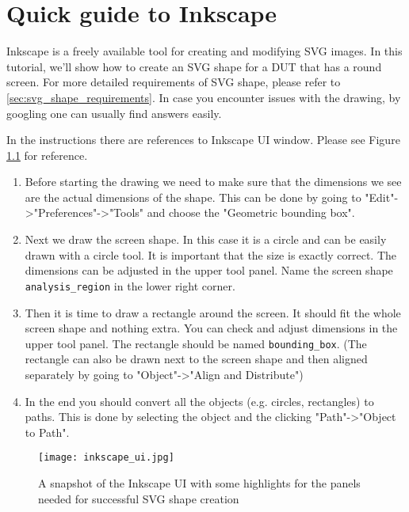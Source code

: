 \chapter{Quick guide to Inkscape}
\label{app:inkscape_guide}
Inkscape is a freely available tool for creating and modifying SVG images. In this tutorial, we'll show how to create an SVG shape for a DUT that has a round screen. For more detailed requirements of SVG shape, please refer to \ref{sec:svg_shape_requirements}. In case you encounter issues with the drawing, by googling one can usually find answers easily.

In the instructions there are references to Inkscape UI window. Please see Figure \ref{fig:inkscape_ui} for reference.

\begin{enumerate}
	\item Before starting the drawing we need to make sure that the dimensions we see are the actual dimensions of the shape. This can be done by going to "Edit"->"Preferences"->"Tools" and choose the "Geometric bounding box".
	\item Next we draw the screen shape. In this case it is a circle and can be easily drawn with a circle tool. It is important that the size is exactly correct. The dimensions can be adjusted in the upper tool panel. Name the screen shape \texttt{analysis\_region} in the lower right corner.
	\item Then it is time to draw a rectangle around the screen. It should fit the whole screen shape and nothing extra. You can check and adjust dimensions in the upper tool panel. The rectangle should be named \texttt{bounding\_box}. (The rectangle can also be drawn next to the screen shape and then aligned separately by going to "Object"->"Align and Distribute")
	\item In the end you should convert all the objects (e.g. circles, rectangles) to paths. This is done by selecting the object and the clicking "Path"->"Object to Path".
\end{enumerate}

\begin{figure}[h]
	\centering
	\texttt{[image: inkscape\_ui.jpg]}
	\caption{A snapshot of the Inkscape UI with some highlights for the panels needed for successful SVG shape creation}
	\label{fig:inkscape_ui}
\end{figure}


